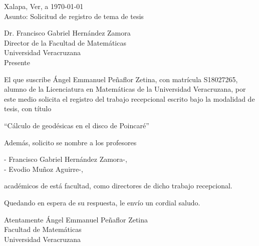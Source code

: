 \documentclass[
  12pt,
  letterpaper,
  spanish
]{letter}
\newcommand{\alumno}{Ángel Emmanuel Peñaflor Zetina}
\newcommand{\matricula}{S18027265}
\newcommand{\directorUno}{Francisco Gabriel Hernández Zamora}
\newcommand{\directorDos}{Evodio Muñoz Aguirre}
\newcommand{\tituloTesis}{Cálculo de geodésicas en el disco de Poincaré}
\newcommand{\universidad}{Universidad Veracruzana}
\newcommand{\facultad}{Facultad de Matemáticas}
\begin{document}
\thispagestyle{empty}
\begin{letter}

\begin{flushright}
  Xalapa, Ver, a \today \\ 
  Asunto: Solicitud de registro de tema de tesis
\end{flushright}

\begin{flushleft}
  Dr. Francisco Gabriel Hernández Zamora\\
  Director de la \facultad \\
  \universidad \\
  Presente
\end{flushleft}

\vspace{12pt}

El que suscribe \alumno, con matrícula \matricula, alumno de la Licenciatura en Matemáticas de la Universidad Veracruzana, por este medio solicita el registro del trabajo recepcional escrito bajo la modalidad de tesis, con título

\begin{center}
  \enquote{\tituloTesis}
\end{center}

Además, solicito se nombre a los profesores

\begin{center}
  - \directorUno \phantom{ }-, \\
  - \directorDos \phantom{ }-,
\end{center}

académicos de está facultad, como directores de dicho trabajo recepcional. 

\vspace{12pt}

\begin{center}
  Quedando en espera de su respuesta, le envío un cordial saludo.
\end{center}

\begin{flushleft}
  Atentamente
  \alumno\\
  \facultad\\
  \universidad\\
\end{flushleft}

\vspace{48pt}

\begin{center}
\end{center}



\end{letter}
\end{document}
